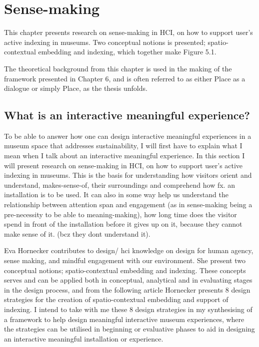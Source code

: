 \section{Sense-making}

This chapter presents research on sense-making in HCI, on how to support user’s active indexing in museums. Two conceptual notions is presented; spatio-contextual embedding and indexing, which together make Figure 5.1. 

The theoretical background from this chapter is used in the making of the framework presented in Chapter 6, and is often referred to as either Place as a dialogue or simply Place, as the thesis unfolds. 

\subsection{What is an interactive meaningful experience?}

To be able to answer how one can design interactive meaningful experiences in a museum space that addresses sustainability, I will first have to explain what I mean when I talk about an interactive meaningful experience. In this section I will present research on sense-making in HCI, on how to support user’s active indexing in museums. This is the basis for understanding how visitors orient and understand, makes-sense-of, their surroundings and comprehend how fx. an installation is to be used. It can also in some way help us understand the relationship between attention span and engagement (as in sense-making being a pre-necessity to be able to meaning-making), how long time does the visitor spend in front of the installation before it gives up on it, because they cannot make sense of it. (bcz they dont understand it).

Eva Hornecker contributes to design/ hci knowledge on design for human agency, sense making, and mindful engagement with our environment. She present two conceptual notions; spatio-contextual embedding and indexing. These concepts serves and can be applied both in conceptual, analytical and in evaluating stages in the design process, and from the following article Hornecker presents 8 design strategies for the creation of spatio-contextual embedding and support of indexing. I intend to take with me these 8 design strategies in my synthesising of a framework to help design meaningful interactive museum experiences, where the strategies can be utilised in beginning or evaluative phases to aid in designing an interactive meaningful installation or experience.


